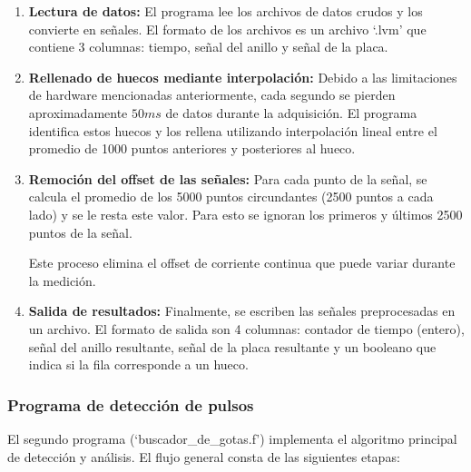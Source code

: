 \documentclass[12pt,a4paper]{article}
\begin{document}
\begin{enumerate}


\item \textbf{Lectura de datos:} El programa lee los archivos de datos crudos y los convierte en señales. El formato de los archivos es un archivo `.lvm' que contiene 3 columnas: tiempo, señal del anillo y señal de la placa.

\item \textbf{Rellenado de huecos mediante interpolación:} Debido a las limitaciones de
hardware mencionadas anteriormente, cada segundo se pierden aproximadamente
$50ms$ de datos durante la adquisición. El programa identifica estos huecos y los
rellena utilizando interpolación lineal entre el promedio de 1000 puntos anteriores y posteriores al hueco.

\item \textbf{Remoción del offset de las señales:} Para cada punto de la señal, se calcula el
promedio de los 5000 puntos circundantes (2500 puntos a cada lado) y se le resta este
valor. Para esto se ignoran los primeros y últimos 2500 puntos de la señal.

Este proceso elimina el offset de corriente continua que puede variar durante la medición.

\item \textbf{Salida de resultados:} Finalmente, se escriben las señales preprocesadas en un archivo. El formato de salida son 4 columnas: contador de tiempo (entero), señal del anillo resultante, señal de la placa resultante y un booleano que indica si la fila corresponde a un hueco.

\end{enumerate}

\subsubsection{Programa de detección de pulsos}

El segundo programa (`buscador\_de\_gotas.f') implementa el algoritmo principal de
detección y análisis. El flujo general consta de las siguientes etapas:
\end{document}
